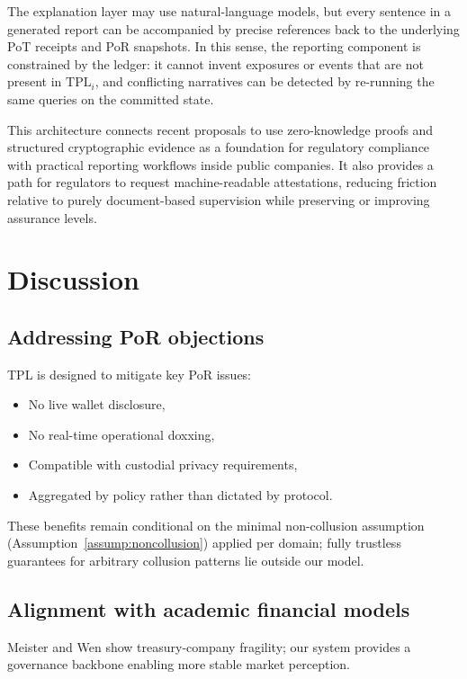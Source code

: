 \documentclass[11pt]{article}
\begin{document}
The explanation layer may use natural-language models, but every sentence in a generated report can be accompanied by precise references back to the underlying PoT receipts and PoR snapshots.
In this sense, the reporting component is constrained by the ledger: it cannot invent exposures or events that are not present in $\mathrm{TPL}_i$, and conflicting narratives can be detected by re-running the same queries on the committed state.

This architecture connects recent proposals to use zero-knowledge proofs and structured cryptographic evidence as a foundation for regulatory compliance~\cite{Decker2025,FedZK2023,ZKSurvey2024} with practical reporting workflows inside public companies.
It also provides a path for regulators to request machine-readable attestations, reducing friction relative to purely document-based supervision while preserving or improving assurance levels.
\section{Discussion}

\subsection{Addressing PoR objections}

TPL is designed to mitigate key PoR issues:

\begin{itemize}[noitemsep]
\item No live wallet disclosure,
\item No real-time operational doxxing,
\item Compatible with custodial privacy requirements,
\item Aggregated by policy rather than dictated by protocol.
\end{itemize}
These benefits remain conditional on the minimal non-collusion assumption (Assumption~\ref{assump:noncollusion}) applied per domain; fully trustless guarantees for arbitrary collusion patterns lie outside our model.

\subsection{Alignment with academic financial models}

Meister and Wen show treasury-company fragility; our system provides a governance backbone enabling more stable market perception.
\end{document}

